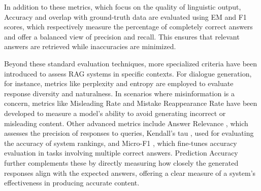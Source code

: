 In addition to these metrics, which focus on the quality of linguistic output, Accuracy and overlap with ground-truth data are evaluated using EM and F1 scores, which respectively measure the percentage of completely correct answers and offer a balanced view of precision and recall. This ensures that relevant answers are retrieved while inaccuracies are minimized.

Beyond these standard evaluation techniques, more specialized criteria have been introduced to assess RAG systems in specific contexts. For dialogue generation, for instance, metrics like perplexity and entropy are employed to evaluate response diversity and naturalness. In scenarios where misinformation is a concern, metrics like Misleading Rate and Mistake Reappearance Rate \cite{liu2023recall} have been developed to measure a model’s ability to avoid generating incorrect or misleading content. Other advanced metrics include Answer Relevance \cite{es2023ragas}, which assesses the precision of responses to queries, Kendall’s tau \cite{Saad2023ARES}, used for evaluating the accuracy of system rankings, and Micro-F1 \cite{Saad2023ARES}, which fine-tunes accuracy evaluation in tasks involving multiple correct answers. Prediction Accuracy further complements these by directly measuring how closely the generated responses align with the expected answers, offering a clear measure of a system’s effectiveness in producing accurate content.


